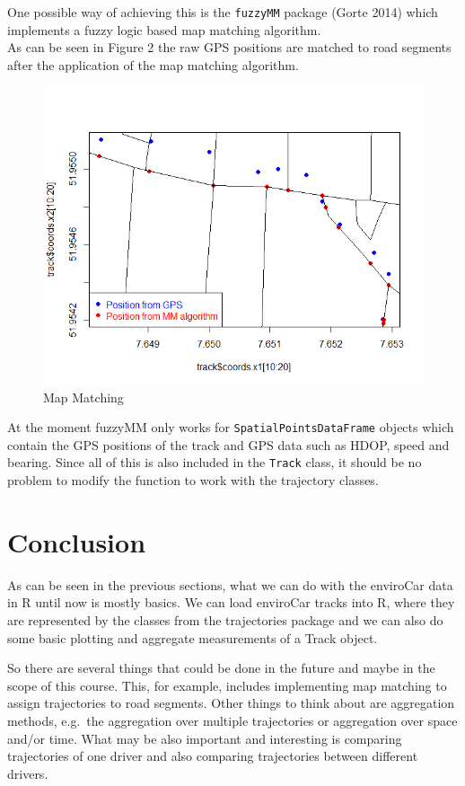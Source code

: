 \documentclass[]{article}
\begin{document}
One possible way of achieving this is the \texttt{fuzzyMM} package
(Gorte 2014) which implements a fuzzy logic based map matching
algorithm.\\As can be seen in Figure 2 the raw GPS positions are matched
to road segments after the application of the map matching algorithm.

\begin{figure}[h!]
  \centering
    \includegraphics[width=1\textwidth]{figures/urban.png}
    \caption{Map Matching}
    \label{fig:mm}
\end{figure}

At the moment fuzzyMM only works for \texttt{SpatialPointsDataFrame}
objects which contain the GPS positions of the track and GPS data such
as HDOP, speed and bearing. Since all of this is also included in the
\texttt{Track} class, it should be no problem to modify the function to
work with the trajectory classes.

\section{Conclusion}\label{conclusion}

As can be seen in the previous sections, what we can do with the
enviroCar data in R until now is mostly basics. We can load enviroCar
tracks into R, where they are represented by the classes from the
trajectories package and we can also do some basic plotting and
aggregate measurements of a Track object.

So there are several things that could be done in the future and maybe
in the scope of this course. This, for example, includes implementing
map matching to assign trajectories to road segments. Other things to
think about are aggregation methods, e.g.~the aggregation over multiple
trajectories or aggregation over space and/or time. What may be also
important and interesting is comparing trajectories of one driver and
also comparing trajectories between different drivers.
\end{document}

